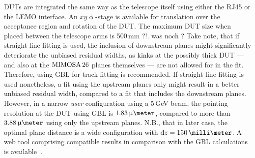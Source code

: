 
DUTs are integrated the same way as the telescope itself using either the RJ45 or the LEMO interface. 
An $xy\upphi$-stage is available for translation over the acceptance region and rotation of the DUT. 
The maximum DUT size when placed between the telescope arms is 500\,mm ?!.
was noch ?
Take note, that if straight line fitting is used, the inclusion of downstream planes might significantly deteriorate the unbiased residual widths,
 as kinks at the possibly thick DUT --- and also at the $\textrm{MIMOSA\,26}$ planes themselves --- are not allowed for in the fit.
Therefore, using GBL for track fitting is recommended. 
If straight line fitting is used nonetheless, a fit using the upstream planes only might result in a better unbiased residual width, compared to a fit that includes the downstream planes.
However, in a narrow \textit{user} configuration using a 5\,GeV beam, the pointing resolution at the DUT using GBL is $1.83\,\upmu\meter$, compared to more than $3.88\,\upmu\meter$ using only the upstream planes.
N.B., that in later case, the optimal plane distance is a wide configuration with $\dz = 150\,\milli\meter$.
A web tool comprising compatible results in comparison with the GBL calculations is available~\cite{webtool}.